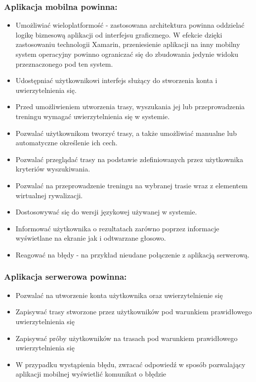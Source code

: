 \subsubsection{Aplikacja mobilna powinna:}
\begin{itemize}
\item{Umożliwiać wieloplatformość} - zastosowana architektura powinna oddzielać logikę biznesową aplikacji od interfejsu graficznego. W efekcie dzięki zastosowaniu technologii Xamarin, przeniesienie aplikacji na inny mobilny system operacyjny powinno ograniczać się do zbudowania jedynie widoku przeznaczonego pod ten system.
\item{Udostępniać użytkownikowi interfejs służący do stworzenia konta i uwierzytelnienia się.}
\item{Przed umożliwieniem utworzenia trasy, wyszukania jej lub przeprowadzenia treningu wymagać uwierzytelnienia się w systemie.}
\item{Pozwalać użytkownikom tworzyć trasy, a także umożliwiać manualne lub automatyczne określenie ich cech.}
\item{Pozwalać przeglądać trasy na podstawie zdefiniowanych przez użytkownika kryteriów wyszukiwania.}
\item{Pozwalać na przeprowadzenie treningu na wybranej trasie wraz z elementem wirtualnej rywalizacji.}
\item{Dostosowywać się do wersji językowej używanej w systemie.}
\item{Informować użytkownika o rezultatach zarówno poprzez informacje wyświetlane na ekranie jak i odtwarzane głosowo.}
\item{Reagować na błędy - na przykład nieudane połączenie z aplikacją serwerową.}
\end{itemize}

\subsubsection{Aplikacja serwerowa powinna:}
\begin{itemize}
\item{Pozwalać na utworzenie konta użytkownika oraz uwierzytelnienie się}
\item{Zapisywać trasy stworzone przez użytkowników pod warunkiem prawidłowego uwierzytelnienia się}
\item{Zapisywać próby użytkowników na trasach pod warunkiem prawidłowego uwierzytelnienia się}
\item{W przypadku wystąpienia błędu, zwracać odpowiedź w sposób pozwalający aplikacji mobilnej wyświetlić komunikat o błędzie}
\end{itemize}

